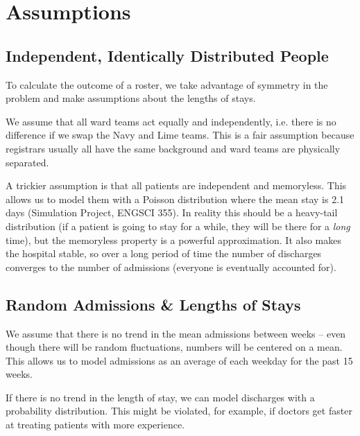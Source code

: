 \documentclass[a4paper]{article}
\begin{document}
\section{Assumptions}
\begin{multicols}{2}
\subsection{Independent, Identically Distributed People}

To calculate the outcome of a roster, we take advantage of symmetry in the problem and make assumptions about the lengths of stays.

We assume that all ward teams act equally and independently, i.e. there is no difference if we swap the Navy and Lime teams. This is a fair assumption because registrars usually all have the same background and ward teams are physically separated.

A trickier assumption is that all patients are independent and memoryless. This allows us to model them with a Poisson distribution where the mean stay is 2.1 days (Simulation Project, ENGSCI 355).
In reality this should be a heavy-tail distribution (if a patient is going to stay for a while, they will be there for a \emph{long} time), but the memoryless property is a powerful approximation. It also makes the hospital stable, so over a long period of time the number of discharges converges to the number of admissions (everyone is eventually accounted for).

\subsection{Random Admissions \& Lengths of Stays}

We assume that there is no trend in the mean admissions between weeks -- even though there will be random fluctuations, numbers will be centered on a mean. This allows us to model admissions as an average of each weekday for the past 15 weeks.

If there is no trend in the length of stay, we can model discharges with a probability distribution. This might be violated, for example, if doctors get faster at treating patients with more experience.

\end{multicols}
\end{document}
